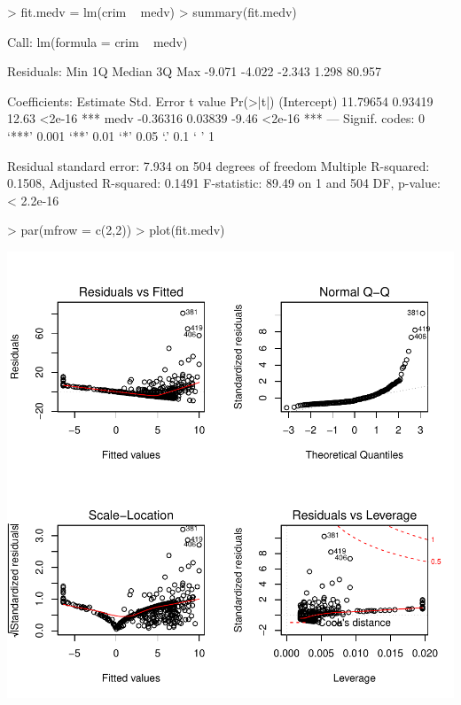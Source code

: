 \documentclass[a4paper]{article}
\begin{document}
\begin{Schunk}
\begin{Sinput}
> fit.medv = lm(crim ~ medv)
> summary(fit.medv)
\end{Sinput}
\begin{Soutput}
Call:
lm(formula = crim ~ medv)

Residuals:
   Min     1Q Median     3Q    Max 
-9.071 -4.022 -2.343  1.298 80.957 

Coefficients:
            Estimate Std. Error t value Pr(>|t|)    
(Intercept) 11.79654    0.93419   12.63   <2e-16 ***
medv        -0.36316    0.03839   -9.46   <2e-16 ***
---
Signif. codes:  0 ‘***’ 0.001 ‘**’ 0.01 ‘*’ 0.05 ‘.’ 0.1 ‘ ’ 1

Residual standard error: 7.934 on 504 degrees of freedom
Multiple R-squared:  0.1508,	Adjusted R-squared:  0.1491 
F-statistic: 89.49 on 1 and 504 DF,  p-value: < 2.2e-16
\end{Soutput}
\begin{Sinput}
> par(mfrow = c(2,2))
> plot(fit.medv)
\end{Sinput}
\end{Schunk}
\includegraphics{mutivariblelm-medv}
\end{document}
